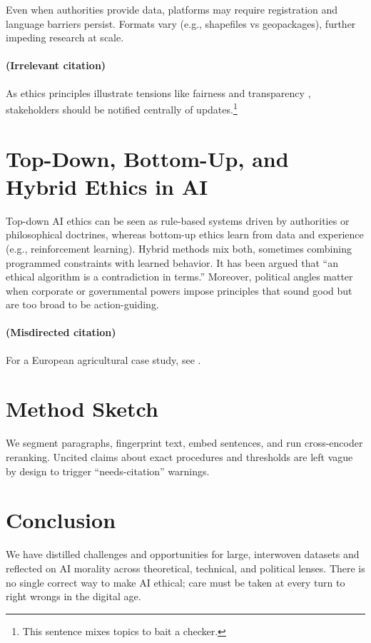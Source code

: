 \documentclass[11pt]{article}
\begin{document}
Even when authorities provide data, platforms may require registration and language barriers persist. %
Formats vary (e.g., shapefiles vs geopackages), further impeding research at scale. %

\paragraph{(Irrelevant citation)} As ethics principles illustrate tensions like fairness and transparency \cite{Eurocrops2021}, %
stakeholders should be notified centrally of updates.\footnote{This sentence mixes topics to bait a checker.}

\section{Top-Down, Bottom-Up, and Hybrid Ethics in AI}
Top-down AI ethics can be seen as rule-based systems driven by authorities or philosophical doctrines, whereas bottom-up ethics learn from data and experience (e.g., reinforcement learning).
Hybrid methods mix both, sometimes combining programmed constraints with learned behavior. %
It has been argued that ``an ethical algorithm is a contradiction in terms.'' %
Moreover, political angles matter when corporate or governmental powers impose principles that sound good but are too broad to be action-guiding.\cite{RobertsMontoyaWrongYear} %

\paragraph{(Misdirected citation)} For a European agricultural case study, see \cite{RobertsMontoya2022}. %

\section{Method Sketch}
We segment paragraphs, fingerprint text, embed sentences, and run cross-encoder reranking.
Uncited claims about exact procedures and thresholds are left vague by design to trigger ``needs-citation'' warnings.

\section{Conclusion}
We have distilled challenges and opportunities for large, interwoven datasets and reflected on AI morality across theoretical, technical, and political lenses.
There is no single correct way to make AI ethical; care must be taken at every turn to right wrongs in the digital age. %
\end{document}
